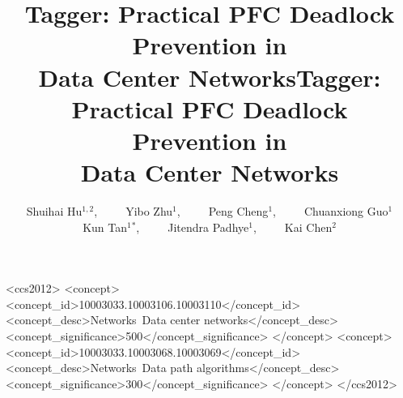 \documentclass[sigconf]{acmart}
\newcommand{\sysname}{Tagger}
\begin{document}
	
	
	
	
	\title{\sysname{}: Practical PFC Deadlock Prevention in\\Data Center Networks}
	
	\author{Shuihai Hu$^{1,2}$,~~~~~Yibo Zhu$^{1}$,~~~~~Peng Cheng$^{1}$,~~~~~Chuanxiong Guo$^{1}$\\Kun Tan$^{1}$$^{*}$,~~~~~Jitendra Padhye$^{1}$,~~~~~Kai Chen$^{2}$ }





\title[\sysname{}: Practical PFC Deadlock Prevention in DCNs]{\sysname{}: Practical PFC Deadlock Prevention in\\Data Center Networks}
\renewcommand{\shortauthors}{S. Hu et al.}



%




%

\begin{CCSXML}
	<ccs2012>
	<concept>
	<concept_id>10003033.10003106.10003110</concept_id>
	<concept_desc>Networks~Data center networks</concept_desc>
	<concept_significance>500</concept_significance>
	</concept>
	<concept>
	<concept_id>10003033.10003068.10003069</concept_id>
	<concept_desc>Networks~Data path algorithms</concept_desc>
	<concept_significance>300</concept_significance>
	</concept>
	</ccs2012>
\end{CCSXML}
\end{document}
